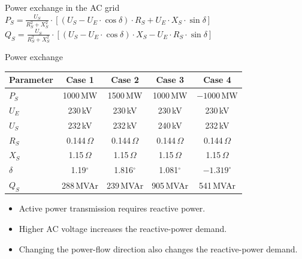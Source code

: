 \begin{frame}{Power exchange in the AC grid}
  \centering
  \\[0.3em]
  \vspace{1em}     
  $P_S = \frac{U_S}{R_{S}^{2}+X_{S}^{2}} \cdot \left[ \left ( U_S - U_E \cdot \cos \delta \right )  \cdot R_S + U_E \cdot X_S \cdot \sin \delta \right]$\\
  \vspace{1em}
  $Q_S = \frac{U_S}{R_{S}^{2}+X_{S}^{2}} \cdot \left[ \left ( U_S - U_E \cdot \cos \delta \right )  \cdot X_S - U_E \cdot R_S \cdot \sin \delta \right]$\\

\end{frame}

\begin{frame}{Power exchange}
  \centering
  \renewcommand{\arraystretch}{1.25}
  \begin{tabular}{@{}l c c c c@{}}
    \textbf{Parameter} & \textbf{Case 1} & \textbf{Case 2} & \textbf{Case 3} & \textbf{Case 4} \\
    \hline
    $P_S$ & 1000\,MW & 1500\,MW & 1000\,MW & $-1000$\,MW \\
    $U_E$ & 230\,kV & 230\,kV & 230\,kV & 230\,kV \\
    $U_S$ & 232\,kV & 232\,kV & 240\,kV & 232\,kV \\
    $R_S$ & 0.144\,$\Omega$ & 0.144\,$\Omega$ & 0.144\,$\Omega$ & 0.144\,$\Omega$ \\
    $X_S$ & 1.15\,$\Omega$ & 1.15\,$\Omega$ & 1.15\,$\Omega$ & 1.15\,$\Omega$ \\
    $\delta$ & 1.19$^\circ$ & 1.816$^\circ$ & 1.081$^\circ$ & $-1.319^\circ$ \\
    $Q_S$ & 288\,MVAr & 239\,MVAr & 905\,MVAr & 541\,MVAr \\
    \hline
  \end{tabular}

  \vspace{0.6em}
  \begin{itemize}
    \setlength{\itemsep}{0.2em}
    \item Active power transmission requires reactive power.
    \item Higher AC voltage increases the reactive-power demand.
    \item Changing the power-flow direction also changes the reactive-power demand.
  \end{itemize}
\end{frame}

